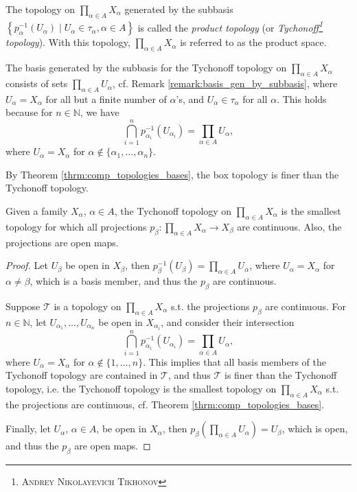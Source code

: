 \begin{defn}
	The topology on $\prod_{\alpha\in A}X_{\alpha}$ generated by the subbasis $\left\{p_{\alpha}^{-1}(U_{\alpha})\mid U_{\alpha}\in\tau_{\alpha}, \alpha\in A\right\}$ is called the \textit{product topology} (or \textit{Tychonoff\footnote{\textsc{Andrey Nikolayevich Tikhonov}} topology}). With this topology, $\prod_{\alpha\in A}X_{\alpha}$ is referred to as the product space.
\end{defn}

\begin{remark}
	The basis generated by the subbasis for the Tychonoff topology on $\prod_{\alpha\in A}X_{\alpha}$ consists of sets $\prod_{\alpha\in A}U_{\alpha}$, cf. Remark \ref{remark:basis_gen_by_subbasis}, where $U_{\alpha} = X_{\alpha}$ for all but a finite number of $\alpha$'s, and $U_{\alpha}\in\tau_{\alpha}$ for all $\alpha$. This holds because for $n\in\mathbb N$, we have
	$$\bigcap_{i=1}^{n} p_{\alpha_i}^{-1}(U_{\alpha_i}) = \prod_{\alpha\in A}U_{\alpha},$$ where $U_{\alpha} = X_{\alpha}$ for $\alpha\notin \{\alpha_1, \dots, \alpha_n\}$.
\end{remark}

\begin{remark}
	By Theorem \ref{thrm:comp_topologies_bases}, the box topology is finer than the Tychonoff topology.
\end{remark}

\begin{theorem}
	Given a family $X_{\alpha}$, $\alpha\in A$, the Tychonoff topology on $\prod_{\alpha\in A}X_{\alpha}$ is the smallest topology for which all projections $p_{\beta}: \prod_{\alpha\in A}X_{\alpha}\to X_{\beta}$ are continuous. Also, the projections are open maps.
\end{theorem}

\begin{proof}
	Let $U_{\beta}$ be open in $X_{\beta}$, then $p_{\beta}^{-1}(U_{\beta}) = \prod_{\alpha\in A}U_{\alpha}$, where $U_{\alpha} = X_{\alpha}$ for $\alpha\ne\beta$, which is a basis member, and thus the $p_{\beta}$ are continuous. 
	
	Suppose $\mathscr T$ is a topology on $\prod_{\alpha\in A}X_{\alpha}$ s.t. the projections $p_{\beta}$ are continuous. For $n\in\mathbb N$, let $U_{\alpha_1}, \dots, U_{\alpha_n}$ be open in $X_{\alpha_i}$, and consider their intersection
	$$\bigcap_{i=1}^{n} p_{\alpha_i}^{-1}(U_{\alpha_i}) = \prod_{\alpha\in A}U_{\alpha},$$
	where $U_{\alpha} = X_{\alpha}$ for $\alpha\notin \{1, \dots, n\}$. This implies that all basis members of the Tychonoff topology are contained in $\mathscr T$, and thus $\mathscr T$ is finer than the Tychonoff topology, i.e. the Tychonoff topology is the smallest topology on $\prod_{\alpha\in A}X_{\alpha}$ s.t. the projections are continuous, cf. Theorem \ref{thrm:comp_topologies_bases}.
	
	Finally, let $U_{\alpha}$, $\alpha\in A$, be open in $X_{\alpha}$, then $p_{\beta}(\prod_{\alpha\in A}U_{\alpha}) = U_{\beta}$, which is open, and thus the $p_{\beta}$ are open maps.
\end{proof}


